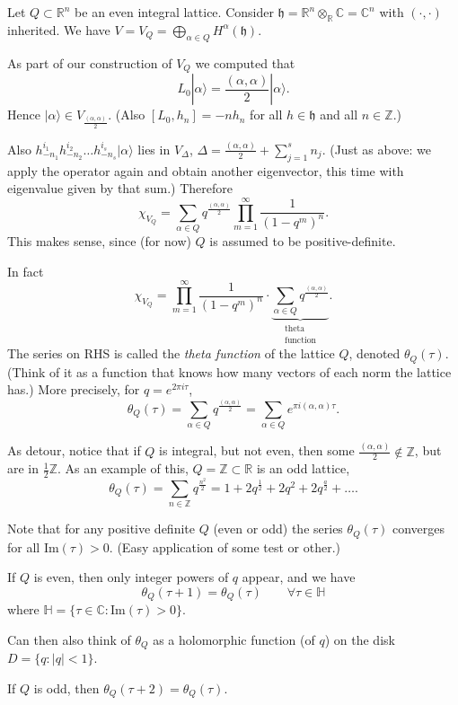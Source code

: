 \begin{example}
\label{example-lattice-vertex-algebra-character}
Let $Q \subset \mathbb{R}^n$ be an even integral lattice.
Consider 
$\mathfrak{h}=\mathbb{R}^n \otimes_{\mathbb{R}} \mathbb{C}=\mathbb{C}^n$
with $(\cdot,\cdot)$ inherited.
We have $V=V_Q=\bigoplus_{\alpha \in Q}H^\alpha(\mathfrak{h})$.

As part of our construction of $V_Q$ we computed that
$$
L_0|\alpha\rangle=\frac{(\alpha,\alpha)}{2}|\alpha\rangle.
$$
Hence $|\alpha\rangle\in V_{\frac{(\alpha,\alpha)}{2}}$.
(Also $[L_0,h_n]=-nh_n$ 
for all $h \in \mathfrak{h}$ and all $n \in \mathbb{Z}$.)

Also $h_{-n_1}^{i_1}h_{-n_2}^{i_2}\ldots h_{-n_s}^{i_s}|\alpha\rangle$
lies in $V_{\Delta}$, $\Delta=\frac{(\alpha,\alpha)}{2}
+\sum_{j=1}^sn_j$. (Just as above: we apply the operator again
and obtain another eigenvector, this time with eigenvalue given by that sum.)
Therefore
$$
\chi_{V_Q}=\sum_{\alpha \in Q}q^{\frac{(\alpha,\alpha)}{2}}
\prod_{m=1}^\infty \frac{1}{(1-q^m)^n}.
$$
This makes sense, since (for now) $Q$ is assumed to be positive-definite.

In fact
$$
\chi_{V_Q}=\prod_{m=1}^\infty\frac{1}{(1-q^m)^n}\cdot
\underbrace{\sum_{\alpha \in Q}q^{\frac{(\alpha,\alpha)}{2}}}_{
\substack{\text{theta} \\ \text{function}}}.
$$
The series on RHS is called the {\it theta function} 
of the lattice $Q$, denoted $\theta_Q(\tau)$.
(Think of it as a function that knows how many vectors of each
norm the lattice has.)
More precisely, for $q=e^{2\pi i \tau}$,
$$
\theta_Q(\tau)=\sum_{\alpha \in Q}q^{\frac{(\alpha,\alpha)}{2}}
=\sum_{\alpha \in Q}e^{\pi i (\alpha,\alpha)\tau}.
$$

As detour, notice that if $Q$ is integral, but not even,
then some $\frac{(\alpha,\alpha)}{2} \not \in \mathbb{Z}$,
but are in $\frac{1}{2}\mathbb{Z}$.
As an example of this, $Q=\mathbb{Z} \subset \mathbb{R}$ is
an odd lattice,
$$
\theta_Q(\tau)=
\sum_{n \in \mathbb{Z}}q^{\frac{n^2}{2}}
=1+2q^{\frac{1}{2}}+2q^2+2q^{\frac{a}{2}}+\ldots.
$$
\end{example}

\begin{remark}
\label{remark-theta-function-converges}
Note that for any positive definite $Q$ (even or odd)
the series $\theta_Q(\tau)$ converges for all
$\text{Im}(\tau)>0$.
(Easy application of some test or other.)

If $Q$ is even, then only integer powers of $q$ 
appear, and we have
$$
\theta_Q(\tau+1)=\theta_Q(\tau)\qquad \forall \tau\in \mathbb{H}
$$
where $\mathbb{H}=\{\tau \in \mathbb{C}:\text{Im}(\tau)>0\}$.

Can then also think of $\theta_Q$ as a holomorphic
function (of $q$) on the disk
$D=\{q:|q|<1\}$.

If $Q$ is odd, then $\theta_Q(\tau+2)=\theta_Q(\tau)$.
\end{remark}

